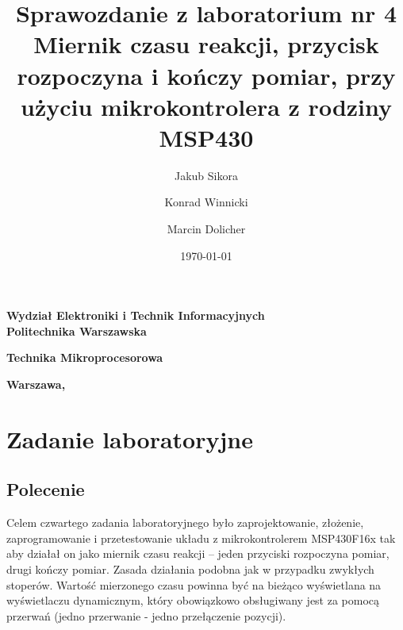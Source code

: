 \documentclass[a4paper,titlepage,11pt,floatssmall]{mwrep}
\title{\bf Sprawozdanie z laboratorium nr 4\\ Miernik czasu reakcji, przycisk rozpoczyna i kończy pomiar, przy użyciu mikrokontrolera z rodziny MSP430  \vskip 0.1cm}
\author{Jakub Sikora \and Konrad Winnicki \and Marcin Dolicher}
\date{\today}
\begin{document}
\makeatletter
\renewcommand{\maketitle}{\begin{titlepage}
		\begin{center}{\LARGE {\bf
					Wydział Elektroniki i Technik Informacyjnych}}\\
			\vspace{0.4cm}
			{\LARGE {\bf Politechnika Warszawska}}\\
			\vspace{0.3cm}
		\end{center}
		\vspace{5cm}
		\begin{center}
			{\bf \LARGE Technika Mikroprocesorowa \vskip 0.1cm}
		\end{center}
		\vspace{1cm}
		\begin{center}
			{\bf \LARGE \@title}
		\end{center}
		\vspace{2cm}
		\begin{center}
			{\bf \Large \@author \par}
		\end{center}
		\vspace*{\stretch{6}}
		\begin{center}
			\bf{\large{Warszawa, \@date\vskip 0.1cm}}
		\end{center}
	\end{titlepage}
	}
\makeatother
\maketitle

\tableofcontents


\chapter{Zadanie laboratoryjne}
\section{Polecenie}
\indent{} Celem czwartego zadania laboratoryjnego było zaprojektowanie, złożenie, zaprogramowanie i przetestowanie układu z mikrokontrolerem MSP430F16x tak aby działał on jako miernik czasu reakcji – jeden przyciski rozpoczyna pomiar, drugi kończy pomiar. Zasada działania podobna jak w przypadku zwykłych stoperów. Wartość mierzonego czasu powinna być na bieżąco wyświetlana na wyświetlaczu dynamicznym, który obowiązkowo obsługiwany jest za pomocą przerwań (jedno przerwanie  - jedno przełączenie pozycji). 
\end{document}
